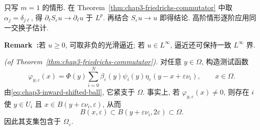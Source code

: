 \begin{Proof}
只写 $m=1$ 的情形. 在 Theorem~\ref{thm:chap3-friedrichs-commutator} 中取 $\alpha_j=\delta_{j\ell}$, 得 $\partial_\ell S_\varepsilon u\to\partial_\ell u$ 于 $L^p$. 再结合 $S_\varepsilon u\to u$ 即得结论. 高阶情形逐阶应用同一交换子估计.
\end{Proof}

\par\noindent{}\textbf{Remark~\thechapterthreesectiontworemark:}\label{rem:chap3-positive-bounded-approximation}\quad 若 $u\geq0$, 可取非负的光滑逼近; 若 $u\in L^\infty$, 逼近还可保持一致 $L^\infty$ 界.

\begin{Proof}
\textit{(of Theorem~\ref{thm:chap3-friedrichs-commutator}).}
对任意 $y\in\Omega$, 构造测试函数
\[
 \varphi_{y,\varepsilon}(x)
 =\Phi(y)\sum_{i=0}^N\beta_\varepsilon(y)\psi_i(y)
 \eta_\varepsilon(y-x+\varepsilon\nu_i),
 \qquad x\in\Omega.
\]
由\eqref{eq:chap3-inward-shifted-ball}, 它紧支于 $\Omega$. 事实上, 若 $\varphi_{y,\varepsilon}(x)\neq0$, 则存在 $i$ 使 $y\in U_i$ 且 $x\in B(y+\varepsilon\nu_i,\varepsilon)$, 从而
\[
 B(x,\varepsilon)\subset B(y+\varepsilon\nu_i,2\varepsilon)\subset\Omega.
\]
因此其支集包含于 $\Omega_\varepsilon$.


\end{Proof}
